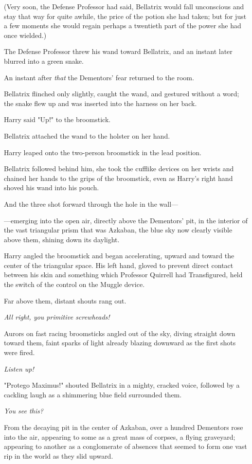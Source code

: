(Very soon, the Defense Professor had said, Bellatrix would fall unconscious
and stay that way for quite awhile, the price of the potion she had taken; but
for just a few moments she would regain perhaps a twentieth part of the power
she had once wielded.)

The Defense Professor threw his wand toward Bellatrix, and an instant later
blurred into a green snake.

An instant after \emph{that} the Dementors' fear returned to the room.

Bellatrix flinched only slightly, caught the wand, and gestured without a word;
the snake flew up and was inserted into the harness on her back.

Harry said "Up!" to the broomstick.

Bellatrix attached the wand to the holster on her hand.

Harry leaped onto the two-person broomstick in the lead position.

Bellatrix followed behind him, she took the cufflike devices on her wrists and
chained her hands to the grips of the broomstick, even as Harry's right hand
shoved his wand into his pouch.

And the three shot forward through the hole in the wall---

---emerging into the open air, directly above the Dementors' pit, in the
interior of the vast triangular prism that was Azkaban, the blue sky now
clearly visible above them, shining down its daylight.

Harry angled the broomstick and began accelerating, upward and toward the
center of the triangular space. His left hand, gloved to prevent direct contact
between his skin and something which Professor Quirrell had Transfigured, held
the switch of the control on the Muggle device.

Far above them, distant shouts rang out.

\emph{All right, you primitive screwheads!}

Aurors on fast racing broomsticks angled out of the sky, diving straight down
toward them, faint sparks of light already blazing downward as the first shots
were fired.

\emph{Listen up!}

"Protego Maximus!" shouted Bellatrix in a mighty, cracked voice, followed by a
cackling laugh as a shimmering blue field surrounded them.

\emph{You see this?}

From the decaying pit in the center of Azkaban, over a hundred Dementors rose
into the air, appearing to some as a great mass of corpses, a flying graveyard;
appearing to another as a conglomerate of absences that seemed to form one vast
rip in the world as they slid upward.

